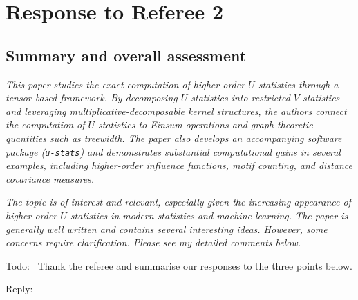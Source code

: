 \documentclass[12pt]{article}
\newenvironment{reply}{\par\smallskip\noindent\color{blue}Reply:\ \ignorespaces}{\par}
\newenvironment{todo}{\par\smallskip\noindent\color{red}Todo:\ \ignorespaces}{\par}
\theoremstyle{plain}
\theoremstyle{definition}
\begin{document}
\newpage


\section*{Response to Referee 2}

\subsection*{Summary and overall assessment}

\emph{This paper studies the exact computation of higher-order $U$-statistics through a tensor-based framework. By decomposing $U$-statistics into restricted $V$-statistics and leveraging multiplicative-decomposable kernel structures, the authors connect the computation of $U$-statistics to Einsum operations and graph-theoretic quantities such as treewidth. The paper also develops an accompanying software package (\texttt{u-stats}) and demonstrates substantial computational gains in several examples, including higher-order influence functions, motif counting, and distance covariance measures.}

\emph{The topic is of interest and relevant, especially given the increasing appearance of higher-order $U$-statistics in modern statistics and machine learning. The paper is generally well written and contains several interesting ideas. However, some concerns require clarification. Please see my detailed comments below.}

\begin{todo}
    Thank the referee and summarise our responses to the three points below.
\end{todo}
\begin{reply}      \end{reply}
\end{document}
